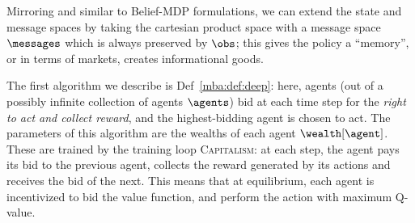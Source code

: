 Mirroring \citep{kweeMarketBasedReinforcementLearning2001} and similar to Belief-MDP formulations, we can extend the state and message spaces by taking the cartesian product space with a message space $\messages$ which is always preserved by $\obs$; this gives the policy a ``memory'', or in terms of markets, creates informational goods. %


The first algorithm we describe is Def~\ref{mba:def:deep}: here, agents (out of a possibly infinite collection of agents $\agents$) bid at each time step for the \emph{right to act and collect reward}, and the highest-bidding agent is chosen to act. The parameters of this algorithm are the wealths of each agent $\wealth[\agent]$. These are trained by the training loop \textsc{Capitalism}: at each step, the agent pays its bid to the previous agent, collects the reward generated by its actions and receives the bid of the next. This means that at equilibrium, each agent is incentivized to bid the value function, and perform the action with maximum Q-value.

